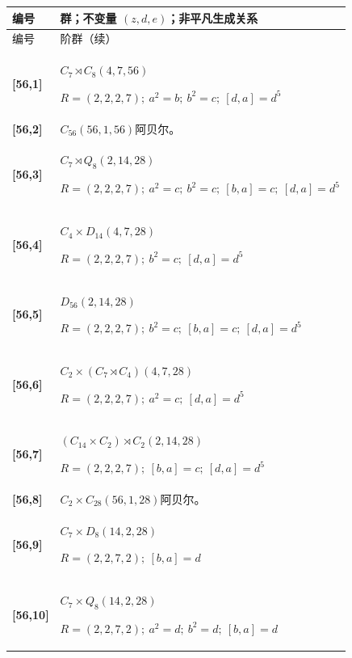 \documentclass[UTF8,fontset=fandol,11pt,a4paper]{ctexart}
\begin{document}
\begin{longtable}{@{}p{17mm}>{\raggedright\arraybackslash}p{141mm}@{}}

\toprule 编号 & 群；不变量 $(z,d,e)$；非平凡生成关系\\\midrule\endfirsthead

\toprule 编号 & 56 阶群（续）\\\midrule\endhead\bottomrule\endfoot

\textbf{[56,1]} & $C_{7}\rtimes C_{8}$\quad $(4,7,56)$\par\(R=(2,2,2,7);\allowbreak\ a^{2}=b;\allowbreak\ b^{2}=c;\allowbreak\ [d,a]=d^{5}\)\\[3pt]

\textbf{[56,2]} & $C_{56}$\quad $(56,1,56)$\quad 阿贝尔。\\[3pt]

\textbf{[56,3]} & $C_{7}\rtimes Q_{8}$\quad $(2,14,28)$\par\(R=(2,2,2,7);\allowbreak\ a^{2}=c;\allowbreak\ b^{2}=c;\allowbreak\ [b,a]=c;\allowbreak\ [d,a]=d^{5}\)\\[3pt]

\textbf{[56,4]} & $C_{4}\times D_{14}$\quad $(4,7,28)$\par\(R=(2,2,2,7);\allowbreak\ b^{2}=c;\allowbreak\ [d,a]=d^{5}\)\\[3pt]

\textbf{[56,5]} & $D_{56}$\quad $(2,14,28)$\par\(R=(2,2,2,7);\allowbreak\ b^{2}=c;\allowbreak\ [b,a]=c;\allowbreak\ [d,a]=d^{5}\)\\[3pt]

\textbf{[56,6]} & $C_{2}\times (C_{7}\rtimes C_{4})$\quad $(4,7,28)$\par\(R=(2,2,2,7);\allowbreak\ a^{2}=c;\allowbreak\ [d,a]=d^{5}\)\\[3pt]

\textbf{[56,7]} & $(C_{14}\times C_{2})\rtimes C_{2}$\quad $(2,14,28)$\par\(R=(2,2,2,7);\allowbreak\ [b,a]=c;\allowbreak\ [d,a]=d^{5}\)\\[3pt]

\textbf{[56,8]} & $C_{2}\times C_{28}$\quad $(56,1,28)$\quad 阿贝尔。\\[3pt]

\textbf{[56,9]} & $C_{7}\times D_{8}$\quad $(14,2,28)$\par\(R=(2,2,7,2);\allowbreak\ [b,a]=d\)\\[3pt]

\textbf{[56,10]} & $C_{7}\times Q_{8}$\quad $(14,2,28)$\par\(R=(2,2,7,2);\allowbreak\ a^{2}=d;\allowbreak\ b^{2}=d;\allowbreak\ [b,a]=d\)\\[3pt]


\end{longtable}
\end{document}
